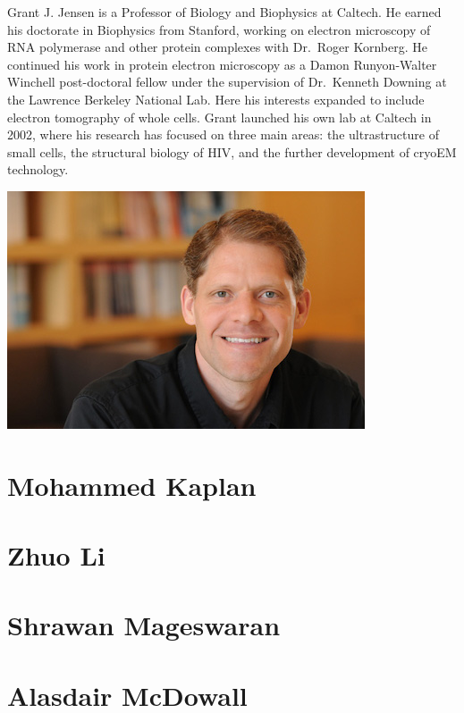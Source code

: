 \documentclass[]{tufte-book}
\begin{document}
Grant J. Jensen is a Professor of Biology and Biophysics at Caltech. He earned his doctorate in Biophysics from Stanford, working on electron microscopy of RNA polymerase and other protein complexes with Dr.~Roger Kornberg. He continued his work in protein electron microscopy as a Damon Runyon-Walter Winchell post-doctoral fellow under the supervision of Dr.~Kenneth Downing at the Lawrence Berkeley National Lab. Here his interests expanded to include electron tomography of whole cells. Grant launched his own lab at Caltech in 2002, where his research has focused on three main areas: the ultrastructure of small cells, the structural biology of HIV, and the further development of cryoEM technology.

\includegraphics{img/bios/grant_jensen}

\hypertarget{mohammed_kaplan}{%
\section*{Mohammed Kaplan}\label{mohammed_kaplan}}

\hypertarget{zhuo_li}{%
\section*{Zhuo Li}\label{zhuo_li}}

\hypertarget{shrawan_mageswaran}{%
\section*{Shrawan Mageswaran}\label{shrawan_mageswaran}}

\hypertarget{alasdair_mcdowall}{%
\section*{Alasdair McDowall}\label{alasdair_mcdowall}}
\end{document}
